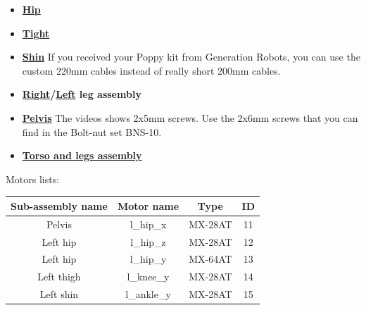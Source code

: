 \documentclass{article}
\begin{document}
\begin{itemize}
\item \textbf{\href{https://github.com/poppy-project/Poppy-lightweight-biped-legs/blob/master/doc/subassemblies/left\_hip\_assembly\_instructions.md}{Hip}}
\item \textbf{\href{https://github.com/poppy-project/Poppy-lightweight-biped-legs/blob/master/doc/subassemblies/left\_thigh\_assembly\_instructions.md}{Tight}}
\item \textbf{\href{https://github.com/poppy-project/Poppy-lightweight-biped-legs/blob/master/doc/subassemblies/left\_shin\_assembly\_instructions.md}{Shin}} If you received your Poppy kit from Generation Robots, you can use the custom 220mm cables instead of really short 200mm cables.
\item \textbf{\href{https://github.com/poppy-project/Poppy-lightweight-biped-legs/blob/master/doc/subassemblies/right\_leg\_assembly\_instructions.md}{Right}/\href{https://github.com/poppy-project/Poppy-lightweight-biped-legs/blob/master/doc/subassemblies/left\_leg\_assembly\_instructions.md}{Left} leg assembly}
\item \textbf{\href{https://github.com/poppy-project/Poppy-lightweight-biped-legs/blob/master/doc/subassemblies/pelvis\_assembly\_instructions.md}{Pelvis}} The videos shows \diameter 2x5mm screws. Use the \diameter 2x6mm screws that you can find in the Bolt-nut set BNS-10.
\item \textbf{\href{https://github.com/poppy-project/poppy-humanoid/blob/master/hardware/doc/Poppy\_Humanoid\_assembly\_instructions.md}{Torso and legs assembly}}
\end{itemize}


Motors lists:

\begin{center}

\begin{tabular}{|c|c|c|c|}
\hline 
Sub-assembly name & Motor name & Type & ID \\ 
\hline 
Pelvis & l\_hip\_x & MX-28AT & 11 \\ 
\hline 
Left hip & l\_hip\_z & MX-28AT & 12 \\ 
\hline 
Left hip & l\_hip\_y & MX-64AT & 13 \\ 
\hline 
Left thigh & l\_knee\_y & MX-28AT & 14 \\ 
\hline 
Left shin & l\_ankle\_y & MX-28AT & 15\\
\hline 
\end{tabular} 
\end{center}
\end{document}
